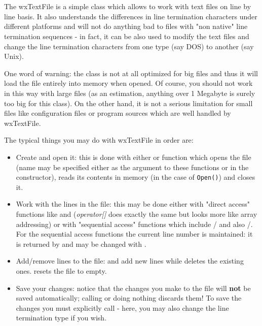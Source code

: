 \section{}\label{wxtextfile}

The wxTextFile is a simple class which allows to work with text files on line by
line basis. It also understands the differences in line termination characters
under different platforms and will not do anything bad to files with "non
native" line termination sequences - in fact, it can be also used to modify the
text files and change the line termination characters from one type (say DOS) to
another (say Unix).

One word of warning: the class is not at all optimized for big files and thus
it will load the file entirely into memory when opened. Of course, you should not
work in this way with large files (as an estimation, anything over 1 Megabyte is
surely too big for this class). On the other hand, it is not a serious
limitation for small files like configuration files or program sources
which are well handled by wxTextFile.

The typical things you may do with wxTextFile in order are:

\begin{itemize}\itemsep=0pt
\item Create and open it: this is done with either 
 or  
function which opens the file (name may be specified either as the argument to
these functions or in the constructor), reads its contents in memory (in the
case of {\tt Open()}) and closes it.
\item Work with the lines in the file: this may be done either with "direct
access" functions like  and 
 ({\it operator[]} does exactly the same
but looks more like array addressing) or with "sequential access" functions
which include /
 and also 
/.
For the sequential access functions the current line number is maintained: it is
returned by  and may be
changed with .
\item Add/remove lines to the file:  and 
 add new lines while 
 deletes the existing ones.
 resets the file to empty.
\item Save your changes: notice that the changes you make to the file will {\bf
not} be saved automatically; calling  or doing
nothing discards them! To save the changes you must explicitly call 
 - here, you may also change the line
termination type if you wish.
\end{itemize}

